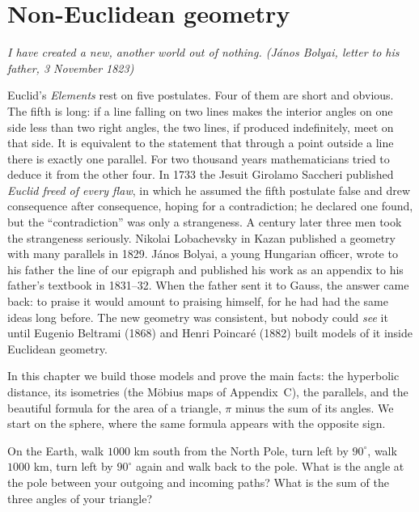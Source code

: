 \chapter{Non-Euclidean geometry}\label{geometry:ch:noneuclid}

\begin{center}\itshape
I have created a new, another world out of nothing.
\upshape(J\'anos Bolyai, letter to his father, 3 November 1823)
\end{center}

Euclid's \emph{Elements} rest on five postulates. Four of them are short and obvious. The fifth is long: if a line falling on two lines makes the interior
angles on one side less than two right angles, the two lines, if produced indefinitely, meet on that side. It is equivalent to the statement that through a
point outside a line there is exactly one parallel. For two thousand years mathematicians tried to deduce it from the other four. In 1733 the Jesuit
Girolamo Saccheri published \emph{Euclid freed of every flaw}, in which he assumed the fifth postulate false and drew consequence after consequence,
hoping for a contradiction; he declared one found, but the ``contradiction'' was only a strangeness. A century later three men took the strangeness
seriously. Nikolai Lobachevsky in Kazan published a geometry with many parallels in 1829. J\'anos Bolyai, a young Hungarian officer, wrote to his father
the line of our epigraph and published his work as an appendix to his father's textbook in 1831--32. When the father sent it to Gauss, the answer came
back: to praise it would amount to praising himself, for he had had the same ideas long before. The new geometry was consistent, but nobody could
\emph{see} it until Eugenio Beltrami (1868) and Henri Poincaré (1882) built models of it inside Euclidean geometry.

In this chapter we build those models and prove the main facts: the hyperbolic distance, its isometries (the M\"obius maps of Appendix~C), the
parallels, and the beautiful formula for the area of a triangle, $\pi$ minus the sum of its angles. We start on the sphere, where the same formula appears
with the opposite sign.

\begin{think}
On the Earth, walk $1000$ km south from the North Pole, turn left by $90^\circ$, walk $1000$ km, turn left by $90^\circ$ again and walk back to the pole.
What is the angle at the pole between your outgoing and incoming paths? What is the sum of the three angles of your triangle?
\end{think}

